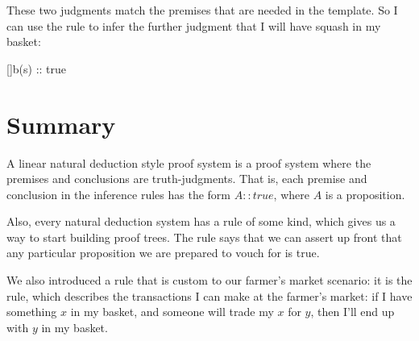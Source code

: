 \documentclass[../../../main.tex]{subfiles}
\begin{document}
\noindent
These two judgments match the premises that are needed in the  template. So I can use the  rule to infer the further judgment that I will have squash in my basket:

\begin{prooftree*}
  \hypo{}
  \ellipsis{}{}

  \hypo{}
  \ellipsis{}{}  

  []{b(s) :: true}
\end{prooftree*}


\section{Summary}

A linear natural deduction style proof system is a proof system where the premises and conclusions are truth-judgments. That is, each premise and conclusion in the inference rules has the form $A :: true$, where $A$ is a proposition.

Also, every natural deduction system has a  rule of some kind, which gives us a way to start building proof trees. The  rule says that we can assert up front that any particular proposition we are prepared to vouch for is true.

We also introduced a rule that is custom to our farmer's market scenario: it is the  rule, which describes the transactions I can make at the farmer's market: if I have something $x$ in my basket, and someone will trade my $x$ for $y$, then I'll end up with $y$ in my basket.
\end{document}
